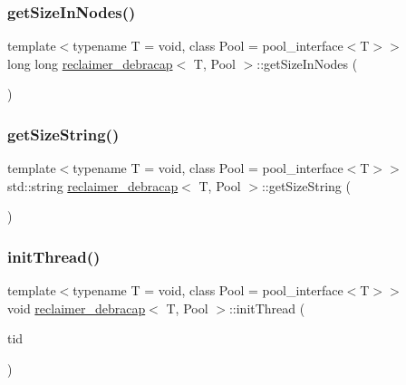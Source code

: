 \subsubsection{\texorpdfstring{get\+Size\+In\+Nodes()}{getSizeInNodes()}}
{\footnotesize\ttfamily template$<$typename T  = void, class Pool  = pool\+\_\+interface$<$\+T$>$$>$ \\
long long \hyperlink{classreclaimer__debracap}{reclaimer\+\_\+debracap}$<$ T, Pool $>$\+::get\+Size\+In\+Nodes (\begin{DoxyParamCaption}{ }\end{DoxyParamCaption})\hspace{0.3cm}{\ttfamily [inline]}}

\mbox{\label{classreclaimer__debracap_adb2070ff175d8131d7da92820c5d2de7}} 
\subsubsection{\texorpdfstring{get\+Size\+String()}{getSizeString()}}
{\footnotesize\ttfamily template$<$typename T  = void, class Pool  = pool\+\_\+interface$<$\+T$>$$>$ \\
std\+::string \hyperlink{classreclaimer__debracap}{reclaimer\+\_\+debracap}$<$ T, Pool $>$\+::get\+Size\+String (\begin{DoxyParamCaption}{ }\end{DoxyParamCaption})\hspace{0.3cm}{\ttfamily [inline]}}

\mbox{\label{classreclaimer__debracap_a6574a166b572ccd201fdcaacf4afa907}} 
\subsubsection{\texorpdfstring{init\+Thread()}{initThread()}}
{\footnotesize\ttfamily template$<$typename T  = void, class Pool  = pool\+\_\+interface$<$\+T$>$$>$ \\
void \hyperlink{classreclaimer__debracap}{reclaimer\+\_\+debracap}$<$ T, Pool $>$\+::init\+Thread (\begin{DoxyParamCaption}\item[{const int}]{tid }\end{DoxyParamCaption})\hspace{0.3cm}{\ttfamily [inline]}}

